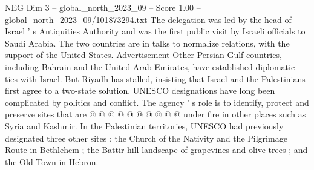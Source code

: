 \begin{textsample}{NEG Dim 3 – global\_north\_2023\_09 – Score 1.00 – global\_north\_2023\_09/101873294.txt}
The delegation was led by the head of Israel ' s Antiquities Authority and was the first public visit by Israeli officials to Saudi Arabia.
The two countries are in talks to normalize relations, with the support of the United States.
Advertisement Other Persian Gulf countries, including Bahrain and the United Arab Emirates, have established diplomatic ties with Israel.
But Riyadh has stalled, insisting that Israel and the Palestinians first agree to a two-state solution.
UNESCO designations have long been complicated by politics and conflict.
The agency ' s role is to identify, protect and preserve sites that are @ @ @ @ @ @ @ @ @ @ under fire in other places such as Syria and Kashmir.
In the Palestinian territories, UNESCO had previously designated three other sites : the Church of the Nativity and the Pilgrimage Route in Bethlehem ; the Battir hill landscape of grapevines and olive trees ; and the Old Town in Hebron.

\end{textsample}
